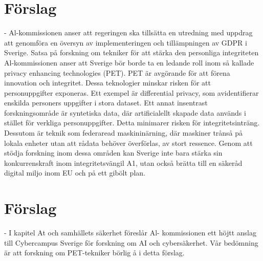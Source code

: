{{{{{{{{{\section*{Förslag}
- Al-kommissionen anser att regeringen ska tillsätta en utredning med uppdrag att genomföra en översyn av implementeringen och tillämpningen av GDPR i Sverige.
Satsa på forskning om tekniker för att stärka den personliga integriteten
Al-kommissionen anser att Sverige bör borde ta en ledande roll inom så kallade privacy enhancing technologies (PET). PET är avgörande för att förena innovation och integritet. Dessa teknologier minskar risken för att personuppgifter exponeras. Ett exempel är differential privacy, som avidentifierar enskilda personers uppgifter i stora dataset. Ett annat insentrast forskningsområde är syntetiska data, där artificialellt skapade data används i stället för verkliga personuppgifter. Detta minimarer risken för integritetsinträng. Dessutom är teknik som federaread maskininärning, där maskiner trånså på lokala enheter utan att rådata behöver överförlas, av stort ressence. Genom att stödja forskning inom dessa områden kan Sverige inte bara stärka sin konkurrenskraft inom integritetsvängil A1, utan också brätta till en säkeråd digital miljo inom EU och på ett gibölt plan.
\section*{Förslag}
- I kapitel At och samhällets säkerhet föreslår Al-
kommissionen ett höjtt anslag till Cybercampus Sverige för forskning om AI och cybersäkerhet. Vår bedömning är att forskning om PET-tekniker börlig å i detta förslag.
}}}}}}}}}
